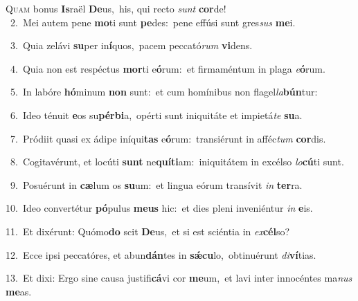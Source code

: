 \lettrine{\initial\textcolor{\initialcolor}{Q}}{uam} bonus \textbf{Is}\-raël \textbf{De}\-us,~\star his, qui recto \textit{sunt} \textbf{cor}\-de!\\
{\numbfont\textcolor{\numbcolor}{~2.}}~Mei autem pene \textbf{mo}\-ti sunt \textbf{pe}\-des:~\star pene effúsi sunt gres\textit{sus} \textbf{me}\-i.\par
{\numbfont\textcolor{\numbcolor}{~3.}}~Quia zelávi \textbf{su}\-per in\-\textbf{í}\-quos,~\star pacem peccató\textit{rum} \textbf{vi}\-dens.\par
{\numbfont\textcolor{\numbcolor}{~4.}}~Quia non est respéctus \textbf{mor}\-ti e\-\textbf{ó}\-rum:~\star et firmaméntum in plaga \textit{e}\-\textbf{ó}rum.\par
{\numbfont\textcolor{\numbcolor}{~5.}}~In labóre \textbf{hó}\-minum \textbf{non} sunt:~\star et cum homínibus non flagel\-\textit{la}\-\textbf{bún}tur:\par
{\numbfont\textcolor{\numbcolor}{~6.}}~Ideo ténuit \textbf{e}\-os su\-\textbf{pér}\-\textbf{bi}a,~\star opérti sunt iniquitáte et impietá\textit{te} \textbf{su}\-a.\par
{\numbfont\textcolor{\numbcolor}{~7.}}~Pródiit quasi ex ádipe iníqui\textbf{tas} e\-\textbf{ó}\-rum:~\star transiérunt in afféc\textit{tum} \textbf{cor}\-dis.\par
{\numbfont\textcolor{\numbcolor}{~8.}}~Cogitavérunt, et locúti \textbf{sunt} ne\-\textbf{quí}\-\textbf{ti}am:~\star iniquitátem in excélso \textit{lo}\-\textbf{cú}ti sunt.\par
{\numbfont\textcolor{\numbcolor}{~9.}}~Posuérunt in \textbf{cæ}\-lum os \textbf{su}\-um:~\star et lingua eórum transívit \textit{in} \textbf{ter}\-ra.\par
{\numbfont\textcolor{\numbcolor}{10.}}~Ideo convertétur \textbf{pó}\-pulus \textbf{me}\-\textbf{us} hic:~\star et dies pleni inveniéntur \textit{in} \textbf{e}\-is.\par
{\numbfont\textcolor{\numbcolor}{11.}}~Et dixérunt: Quómo\textbf{do} scit \textbf{De}\-us,~\star et si est sciéntia in \textit{ex}\-\textbf{cél}so?\par
{\numbfont\textcolor{\numbcolor}{12.}}~Ecce ipsi peccatóres, et abun\-\textbf{dán}\-tes in \textbf{sǽ}\-\textbf{cu}lo,~\star obtinuérunt \textit{di}\-\textbf{ví}tias.\par
{\numbfont\textcolor{\numbcolor}{13.}}~Et dixi: Ergo sine causa justifi\-\textbf{cá}\-vi cor \textbf{me}\-um,~\star et lavi inter innocéntes ma\textit{nus} \textbf{me}\-as.\par
